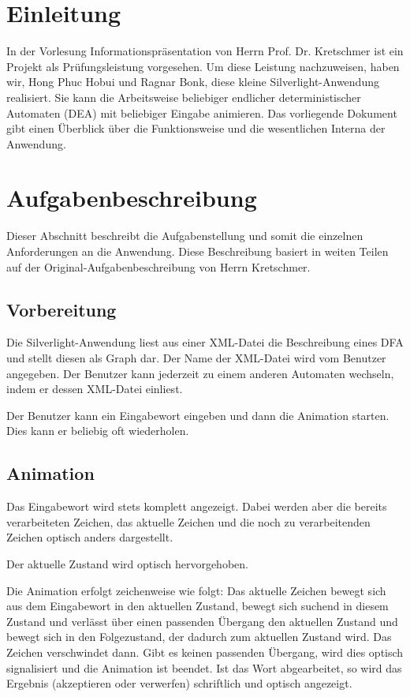 \section{Einleitung}

In der Vorlesung Informationspräsentation von Herrn Prof. Dr. Kretschmer ist
ein Projekt als Prüfungsleistung vorgesehen. Um diese Leistung nachzuweisen,
haben wir, Hong Phuc Hobui und Ragnar Bonk, diese kleine Silverlight-Anwendung
realisiert. Sie kann die Arbeitsweise beliebiger endlicher deterministischer
Automaten (DEA) mit beliebiger Eingabe animieren. Das vorliegende Dokument gibt
einen Überblick über die Funktionsweise und die wesentlichen Interna der
Anwendung.

\section{Aufgabenbeschreibung}
Dieser Abschnitt beschreibt die Aufgabenstellung und somit die einzelnen
Anforderungen an die Anwendung. Diese Beschreibung basiert in weiten Teilen auf
der Original-Aufgabenbeschreibung von Herrn Kretschmer.

\subsection{Vorbereitung}
Die Silverlight-Anwendung liest aus einer XML-Datei die Beschreibung eines DFA
und stellt diesen als Graph dar. Der Name der XML-Datei wird vom Benutzer
angegeben. Der Benutzer kann jederzeit zu einem anderen Automaten wechseln,
indem er dessen XML-Datei einliest. 

Der Benutzer kann ein Eingabewort eingeben und dann die Animation starten. Dies
kann er beliebig oft wiederholen. 

\subsection{Animation}
Das Eingabewort wird stets komplett angezeigt. Dabei werden aber die bereits
verarbeiteten Zeichen, das aktuelle Zeichen und die noch zu verarbeitenden
Zeichen optisch anders dargestellt. 

Der aktuelle Zustand wird optisch hervorgehoben. 

Die Animation erfolgt zeichenweise wie folgt: Das aktuelle Zeichen bewegt sich
aus dem Eingabewort in den aktuellen Zustand, bewegt sich \glqq{}suchend\grqq{}
in diesem Zustand und verlässt über einen passenden Übergang den aktuellen
Zustand und bewegt sich in den Folgezustand, der dadurch zum aktuellen Zustand
wird. Das Zeichen verschwindet dann. Gibt es keinen passenden Übergang, wird
dies optisch signalisiert und die Animation ist beendet. Ist das Wort
abgearbeitet, so wird das Ergebnis (akzeptieren oder verwerfen) schriftlich und
optisch angezeigt. 

